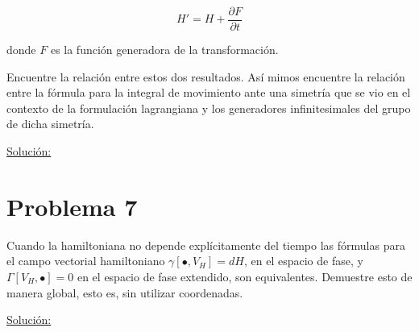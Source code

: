 \documentclass[a4paper,10pt]{article}
\numberwithin{equation}{section}
\begin{document}
$$
H' = H + \frac{\partial F}{\partial t}
$$

donde $F$ es la función generadora de la transformación. 

\vspace{.3cm}

Encuentre la relación entre estos dos resultados. Así mimos encuentre la relación 
entre la fórmula para la integral de movimiento ante una simetría que se vio en el 
contexto de la formulación lagrangiana y los generadores infinitesimales del grupo 
de dicha simetría.

\vspace{.3cm}

\underline{Solución:} \vspace{.3cm}

\section{Problema 7}

Cuando la hamiltoniana no depende explícitamente del tiempo las fórmulas para el 
campo vectorial hamiltoniano $\gamma[\bullet,V_H] = dH$, en el espacio de fase, 
y $\Gamma[V_H,\bullet] = 0$ en el espacio de fase extendido, son equivalentes. 
Demuestre esto de manera global, esto es, sin utilizar coordenadas.

\vspace{.3cm}

\underline{Solución:} \vspace{.3cm}
\end{document}
